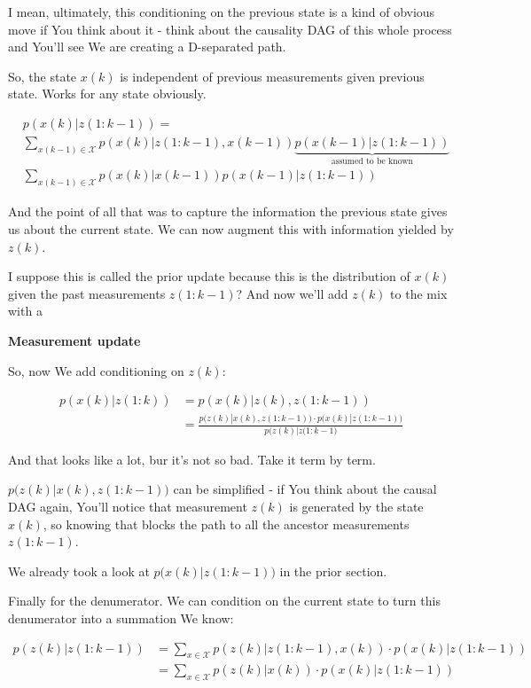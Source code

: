 \documentclass{article}
\begin{document}
		I mean, ultimately, this conditioning on the previous state is a kind of obvious move if You think about it - think about the causality DAG of this whole process and You'll see We are creating a D-separated path.
		
		So, the state $x(k)$ is independent of previous measurements given previous state. Works for any state obviously.
		
		\begin{align*}
			& p(x(k)|z(1:k-1)) =\\
			& \sum_{x(k-1)\in\mathcal{X}} p(x(k)|z(1:k-1), x(k-1))\underbrace{p(x(k-1)|z(1:k-1))}_{\text{assumed to be known}}\\
			& \sum_{x(k-1)\in\mathcal{X}} p(x(k)| x(k-1))p(x(k-1)|z(1:k-1))
		\end{align*}
		
	And the point of all that was to capture the information the previous state gives us about the current state. We can now augment this with information yielded by $z(k)$.
	
	I suppose this is called the prior update because this is the distribution of $x(k)$ given the past measurements $z(1:k-1)$? And now we'll add $z(k)$ to the mix with a 
	
	\textbf{Measurement update}
	
		So, now We add conditioning on $z(k)$:
		
		\begin{align}
			p(x(k)|z(1:k)) &= p(x(k)|z(k), z(1:k-1))\\
			&= \frac{p\big(z(k)|x(k), z(1:k-1)\big)\cdot p\big(x(k)|z(1:k-1)\big)}{p\big( z(k) | z(1:k-1\big)}
		\end{align}
		
		And that looks like a lot, bur it's not so bad. Take it term by term.
		
		$p\big(z(k)|x(k), z(1:k-1)\big)$ can be simplified - if You think about the causal DAG again, You'll notice that measurement $z(k)$ is generated by the state $x(k)$, so knowing that blocks the path to all the ancestor measurements $z(1:k-1)$.
		
		We already took a look at $p\big(x(k)|z(1:k-1)\big)$ in the prior section.
		
		Finally for the denumerator. We can condition on the current state to turn this denumerator into a summation We know:
		
		\begin{align}
			p(z(k)|z(1:k-1)) &= \sum_{x\in\mathcal{X}} p(z(k)|z(1:k-1), x(k))\cdot p(x(k)|z(1:k-1))\\
			&= \sum_{x\in\mathcal{X}} p(z(k)| x(k))\cdot p(x(k)|z(1:k-1))
		\end{align}
		
\end{document}

